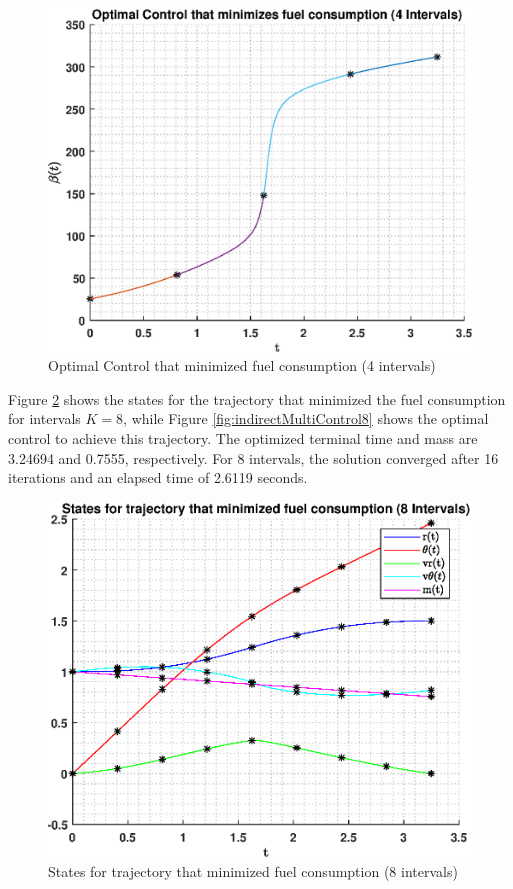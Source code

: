 \documentclass[]{article}
\begin{document}
\begin{figure}
	\centering
	\includegraphics[scale=0.75]{indirectMultiControl4.eps}
	\caption{Optimal Control that minimized fuel consumption (4 intervals)}
	\label{fig:indirectMultiControl4}
\end{figure}
\vspace{2mm}\newline 
Figure \ref{fig:indirectMultiStates8} shows the states for the trajectory that minimized the fuel consumption for intervals \(K = 8\), while Figure \ref{fig:indirectMultiControl8} shows the optimal control to achieve this trajectory. The optimized terminal time and mass are 3.24694 and 0.7555, respectively. For 8 intervals, the solution converged after 16 iterations and an elapsed time of 2.6119 seconds. 
\begin{figure}
	\centering
	\includegraphics[scale=0.75]{indirectMultiStates8.eps}
	\caption{States for trajectory that minimized fuel consumption (8 intervals)}
	\label{fig:indirectMultiStates8}
\end{figure}
\end{document}
